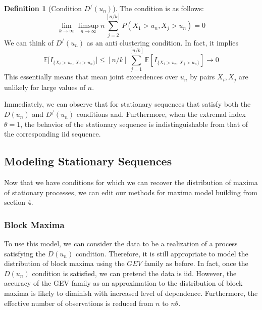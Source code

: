 \documentclass{article}
\theoremstyle{definition}
\theoremstyle{definition}
\newtheorem{definition}{Definition}
\def\E{\mathbb{E}}
\begin{document}
\begin{definition}[Condition $D^/(u_n)$]
The condition is as follows:
\[\lim_{k\rightarrow\infty} \limsup_{n\rightarrow \infty} n\sum_{j=2}^{[{n/k}]}P(X_1>u_n, X_j>u_n)=0\]
We can think of $D^/(u_n)$ as an anti clustering condition. In fact, it implies 
\[\E\bigg[ I_{\{X_i>u_n, X_j>u_n\}} \bigg] \leq [n/k] \sum_{j=1}^{[n/k]}\E [I_{\{X_i>u_n, X_j>u_n\}}] \rightarrow 0\]
This essentially means that mean joint exceedences over $u_n$ by pairs $X_i,X_j$ are unlikely for large values of $n$.
\end{definition}
Immediately, we can observe that for stationary sequences that satisfy both the $D(u_n)$ and $D^/(u_n)$ conditions and. Furthermore, when the extremal index $\theta=1$, the behavior of the stationary sequence is indistinguishable from that of the corresponding iid sequence.
\subsection{Modeling Stationary Sequences}
Now that we have conditions for which we can recover the distribution of maxima of stationary processes, we can edit our methods for maxima model building from section 4. 
\subsubsection{Block Maxima}
To use this model, we can consider the data to be a realization of a process satisfying the $D(u_n)$ condition. Therefore, it is still appropriate to model the distribution of block maxima using the $GEV$ family as before. In fact, once the $D(u_n)$ condition is satisfied, we can pretend the data is iid. However, the accuracy of the GEV family as an approximation to the distribution of block maxima is
likely to diminish with increased level of dependence. Furthermore, the effective number of observations is reduced from $n$ to $n\theta$.
\end{document}

